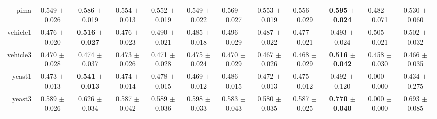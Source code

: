 \begin{table}[!ht]
{\begin{tabular}{r c c c c c c c c c c c}
pima & 0.549 $\pm$ 0.026 & 0.586 $\pm$ 0.019 & 0.554 $\pm$ 0.013 & 0.552 $\pm$ 0.019 & 0.549 $\pm$ 0.022 & 0.569 $\pm$ 0.027 & 0.553 $\pm$ 0.019 & 0.556 $\pm$ 0.029 & \textbf{0.595 $\pm$ 0.024} & 0.482 $\pm$ 0.071 & 0.530 $\pm$ 0.060 \\
vehicle1 & 0.476 $\pm$ 0.020 & \textbf{0.516 $\pm$ 0.027} & 0.476 $\pm$ 0.023 & 0.490 $\pm$ 0.021 & 0.485 $\pm$ 0.018 & 0.496 $\pm$ 0.029 & 0.487 $\pm$ 0.022 & 0.477 $\pm$ 0.021 & 0.493 $\pm$ 0.024 & 0.505 $\pm$ 0.021 & 0.502 $\pm$ 0.032 \\
vehicle3 & 0.470 $\pm$ 0.028 & 0.474 $\pm$ 0.037 & 0.473 $\pm$ 0.026 & 0.471 $\pm$ 0.028 & 0.475 $\pm$ 0.024 & 0.470 $\pm$ 0.029 & 0.467 $\pm$ 0.026 & 0.468 $\pm$ 0.029 & \textbf{0.516 $\pm$ 0.042} & 0.458 $\pm$ 0.030 & 0.466 $\pm$ 0.035 \\
yeast1 & 0.473 $\pm$ 0.013 & \textbf{0.541 $\pm$ 0.013} & 0.474 $\pm$ 0.014 & 0.478 $\pm$ 0.015 & 0.469 $\pm$ 0.012 & 0.486 $\pm$ 0.015 & 0.472 $\pm$ 0.013 & 0.475 $\pm$ 0.012 & 0.492 $\pm$ 0.120 & 0.000 $\pm$ 0.000 & 0.434 $\pm$ 0.275 \\
yeast3 & 0.589 $\pm$ 0.026 & 0.626 $\pm$ 0.034 & 0.587 $\pm$ 0.042 & 0.589 $\pm$ 0.036 & 0.598 $\pm$ 0.033 & 0.583 $\pm$ 0.043 & 0.580 $\pm$ 0.035 & 0.587 $\pm$ 0.025 & \textbf{0.770 $\pm$ 0.040} & 0.000 $\pm$ 0.000 & 0.693 $\pm$ 0.085 \\
\end{tabular}}
\end{table}
